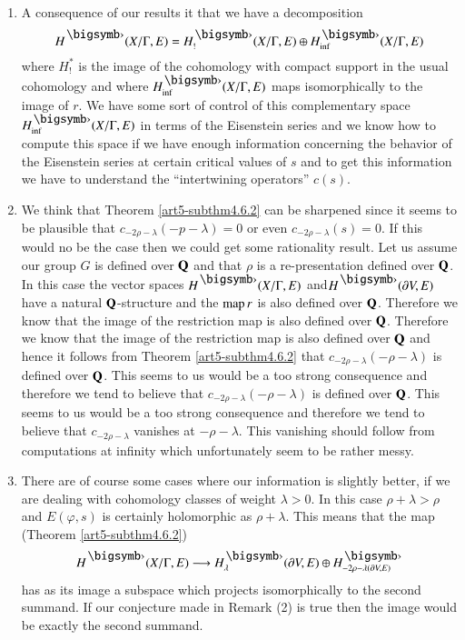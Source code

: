 \begin{cremarks*}
\begin{enumerate}[(1)]
\item A consequence of our results it that we have a decomposition
$$
H^\bigdot (X/ \Gamma, E) = H^\bigdot_! (X/\Gamma, E) \oplus H^\bigdot_{\inf} (X/ \Gamma , E)
$$
where $H^\ast_!$ is the image of the cohomology with compact support in the usual cohomology and where $H^\bigdot_{\inf} (X/ \Gamma, E)$ maps isomorphically to the image of $r$. We have some sort of control of this complementary space $H^\bigdot_{\inf} (X/ \Gamma, E)$ in terms of the Eisenstein series and we know how to compute this space if we have enough information concerning the behavior of the Eisenstein series at certain critical values of $s$ and to get this information we have to understand the ``intertwining operators'' $c(s)$.

\item We think that Theorem \eqref{art5-subthm4.6.2} can be sharpened since it seems to be plausible that $c_{-2\rho-\lambda} (-p -\lambda)=0$ or even $c_{-2\rho -\lambda} (s) = 0$. If this would no be the case then we could get some rationality result. Let us assume our group $G$ is defined over $\mathbf{Q}$ and that $\rho$ is a re-presentation defined over $\mathbf{Q}$. In this case the vector spaces $H^\bigdot (X/ \Gamma, E)$ and\pageoriginale $H^\bigdot (\partial V, E)$ have a natural $\mathbf{Q}$-structure and the $\operatorname{map} r$ is also defined over $\mathbf{Q}$. Therefore we know that the image of the restriction map is also defined over $\mathbf{Q}$. Therefore we know that the image of the restriction map is also defined over $\mathbf{Q}$ and hence it follows from Theorem \eqref{art5-subthm4.6.2} that $c_{-2\rho-\lambda} (-\rho-\lambda)$ is defined over $\mathbf{Q}$. This seems to us would be a too strong consequence and therefore we tend to believe that $c_{-2\rho-\lambda} (-\rho -\lambda)$ is defined over $\mathbf{Q}$. This seems to us would be a too strong consequence and therefore we tend to believe that $c_{-2\rho-\lambda}$ vanishes at $-\rho -\lambda$. This vanishing should follow from computations at infinity which unfortunately seem to be rather messy.

\item There are of course some cases where our information is slightly better, if we are dealing with cohomology classes of weight $\lambda> 0$. In this case $\rho + \lambda > \rho$ and $E(\varphi, s)$ is certainly holomorphic as $\rho + \lambda$. This means that the map (Theorem \eqref{art5-subthm4.6.2})
$$
H^\bigdot (X/ \Gamma , E) \longrightarrow H^\bigdot_{\lambda} (\partial V, E) \oplus H^\bigdot_{- 2 \rho -\lambda (\partial V, E)}
$$
has as its image a subspace which projects isomorphically to the second summand. If our conjecture made in Remark (2) is true then the image would be exactly the second summand.


\end{enumerate}
\end{cremarks*}
